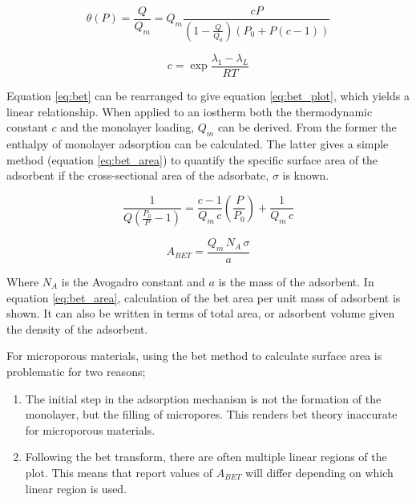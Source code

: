 \begin{equation}\label{eq:bet}
    \theta(P) = \frac{Q}{Q_m} =  Q_m \frac{c P}{\left( 1 - \frac{Q}{Q_0} \right) \left(P_0 + P \left(c - 1 \right) \right)}
\end{equation}

\begin{equation}\label{eq:bet_c}
    c = \exp{\frac{\lambda_1 - \lambda_L}{RT}}
\end{equation}

Equation \ref{eq:bet} can be rearranged to give equation \ref{eq:bet_plot}, which yields a linear relationship. When applied to an iostherm both the thermodynamic constant $c$ and the monolayer loading, $Q_m$ can be derived. From the former the enthalpy of monolayer adsorption can be calculated. The latter gives a simple method (equation \ref{eq:bet_area}) to quantify the specific surface area of the \gls{adsorbent} if the cross-sectional area of the \gls{adsorbate}, $\sigma$ is known.

\begin{equation} \label{eq:bet_plot}
    \frac{1}{Q  \left( \frac{P_0}{P} - 1 \right)} = \frac{c-1}{Q_m \, c}  \left( \frac{P}{P_0} \right) + \frac{1}{Q_m \, c}
\end{equation}

\begin{equation}\label{eq:bet_area}
    A_{BET} = \frac{Q_m \, N_A \, \sigma}{a}
\end{equation}

Where $N_A$ is the Avogadro constant and $a$ is the mass of the \gls{adsorbent}.\citep{Brunauer1938Adsorption} In equation \ref{eq:bet_area}, calculation of the \acrshort{bet} area per unit mass of \gls{adsorbent} is shown. It can also be written in terms of total area, or \gls{adsorbent} volume given the density of the \gls{adsorbent}.

For microporous materials, using the \acrshort{bet} method to calculate surface area is problematic for two reasons;

	\begin{enumerate}[label=(\arabic*)]
		\item The initial step in the \gls{adsorption} mechanism is not the formation of the monolayer, but the filling of \glspl{micropore}. This renders \acrshort{bet} theory inaccurate for microporous materials.
		\item 	Following the \acrshort{bet} transform, there are often multiple linear regions of the plot. This means that report values of $A_{BET}$ will differ depending on which linear region is used.
	\end{enumerate}

